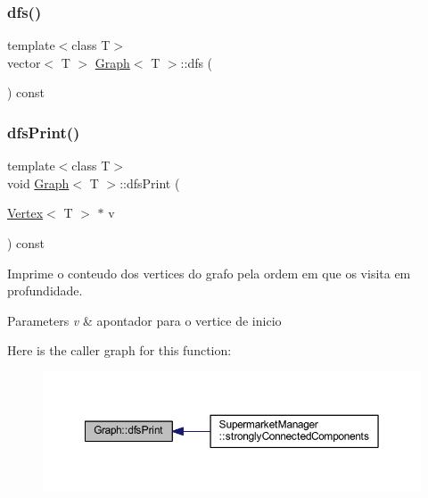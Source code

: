 \mbox{\label{class_graph_a911798b1a89f8c4ae90ba3eee849cff8}} 
\subsubsection{\texorpdfstring{dfs()}{dfs()}\hspace{0.1cm}{\footnotesize\ttfamily [2/2]}}
{\footnotesize\ttfamily template$<$class T$>$ \\
vector$<$ T $>$ \hyperlink{class_graph}{Graph}$<$ T $>$\+::dfs (\begin{DoxyParamCaption}{ }\end{DoxyParamCaption}) const}

\mbox{\label{class_graph_a56fefa2bdd0f7d66eec0ef51c961846a}} 
\subsubsection{\texorpdfstring{dfs\+Print()}{dfsPrint()}}
{\footnotesize\ttfamily template$<$class T$>$ \\
void \hyperlink{class_graph}{Graph}$<$ T $>$\+::dfs\+Print (\begin{DoxyParamCaption}\item[{\hyperlink{class_vertex}{Vertex}$<$ T $>$ $\ast$}]{v }\end{DoxyParamCaption}) const}

Imprime o conteudo dos vertices do grafo pela ordem em que os visita em profundidade.


\begin{DoxyParams}{Parameters}
{\em v} & apontador para o vertice de inicio \\
\hline
\end{DoxyParams}
Here is the caller graph for this function\+:
\nopagebreak
\begin{figure}[H]
\begin{center}
\leavevmode
\includegraphics[width=350pt]{class_graph_a56fefa2bdd0f7d66eec0ef51c961846a_icgraph}
\end{center}
\end{figure}
\mbox{\label{class_graph_a167172d4ecb3f4998caaaf370724b536}} 
